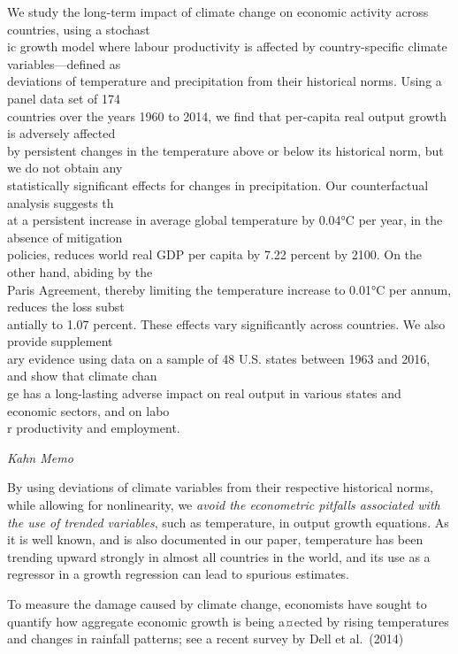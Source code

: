 \documentclass[
]{book}
\begin{document}
We study the long-term impact of climate change on economic activity across countries, using a stochast\\
ic growth model where labour productivity is affected by country-specific climate variables---defined as\\
deviations of temperature and precipitation from their historical norms. Using a panel data set of 174\\
countries over the years 1960 to 2014, we find that per-capita real output growth is adversely affected\\
by persistent changes in the temperature above or below its historical norm, but we do not obtain any\\
statistically significant effects for changes in precipitation. Our counterfactual analysis suggests th\\
at a persistent increase in average global temperature by 0.04°C per year, in the absence of mitigation\\
policies, reduces world real GDP per capita by 7.22 percent by 2100. On the other hand, abiding by the\\
Paris Agreement, thereby limiting the temperature increase to 0.01°C per annum, reduces the loss subst\\
antially to 1.07 percent. These effects vary significantly across countries. We also provide supplement\\
ary evidence using data on a sample of 48 U.S. states between 1963 and 2016, and show that climate chan\\
ge has a long-lasting adverse impact on real output in various states and economic sectors, and on labo\\
r productivity and employment.

\emph{Kahn Memo}

By using deviations of climate variables from
their respective historical norms, while allowing for nonlinearity, we \emph{avoid the econometric
pitfalls associated with the use of trended variables}, such as temperature, in output growth
equations. As it is well known, and is also documented in our paper, temperature has been
trending upward strongly in almost all countries in the world, and its use as a regressor in a
growth regression can lead to spurious estimates.

To measure the damage caused by climate change, economists have sought to quantify
how aggregate economic growth is being a¤ected by rising temperatures and changes in
rainfall patterns; see a recent survey by Dell et al.~(2014)
\end{document}
